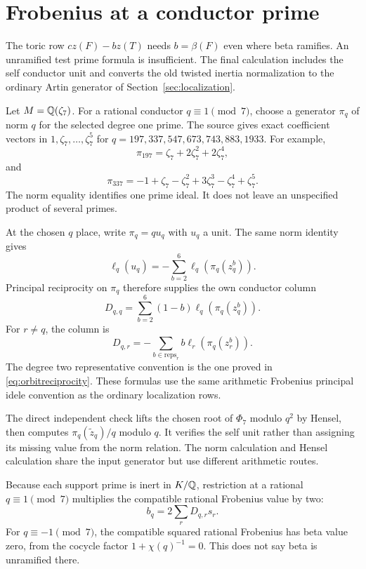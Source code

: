 \section{Frobenius at a conductor prime}\label{sec:self-conductor}
The toric row $cz(F)-bz(T)$ needs $b=\beta(F)$ even where beta ramifies. An unramified test prime formula is insufficient. The final calculation includes the self conductor unit and converts the old twisted inertia normalization to the ordinary Artin generator of Section~\ref{sec:localization}.

Let $M=\mathbb Q(\zeta_7)$. For a rational conductor $q\equiv1\pmod7$, choose a generator $\pi_q$ of norm $q$ for the selected degree one prime. The source gives exact coefficient vectors in $1,\zeta_7,\ldots,\zeta_7^5$ for $q=197,337,547,673,743,883,1933$. For example,
\[
\pi_{197}=\zeta_7+2\zeta_7^2+2\zeta_7^4,
\]
and
\[
\pi_{337}=-1+\zeta_7-\zeta_7^2+3\zeta_7^3-\zeta_7^4+\zeta_7^5.
\]
The norm equality identifies one prime ideal. It does not leave an unspecified product of several primes.

At the chosen $q$ place, write $\pi_q=q u_q$ with $u_q$ a unit. The same norm identity gives
\begin{equation}\label{eq:selfunit}
\ell_q(u_q)=-\sum_{b=2}^6\ell_q(\pi_q(z_q^b)).
\end{equation}
Principal reciprocity on $\pi_q$ therefore supplies the own conductor column
\begin{equation}\label{eq:selfcolumn}
D_{q,q}=\sum_{b=2}^6(1-b)\ell_q(\pi_q(z_q^b)).
\end{equation}
For $r\ne q$, the column is
\begin{equation}\label{eq:othercolumn}
D_{q,r}=-\sum_{b\in\mathrm{reps}_r}b\ell_r(\pi_q(z_r^b)).
\end{equation}
The degree two representative convention is the one proved in \eqref{eq:orbitreciprocity}. These formulas use the same arithmetic Frobenius principal idele convention as the ordinary localization rows.

The direct independent check lifts the chosen root of $\Phi_7$ modulo $q^2$ by Hensel, then computes $\pi_q(\widetilde z_q)/q$ modulo $q$. It verifies the self unit rather than assigning its missing value from the norm relation. The norm calculation and Hensel calculation share the input generator but use different arithmetic routes.

Because each support prime is inert in $K/\mathbb Q$, restriction at a rational $q\equiv1\pmod7$ multiplies the compatible rational Frobenius value by two:
\begin{equation}\label{eq:betaF}
b_q=2\sum_rD_{q,r}s_r.
\end{equation}
For $q\equiv-1\pmod7$, the compatible squared rational Frobenius has beta value zero, from the cocycle factor $1+\chi(q)^{-1}=0$. This does not say beta is unramified there.


